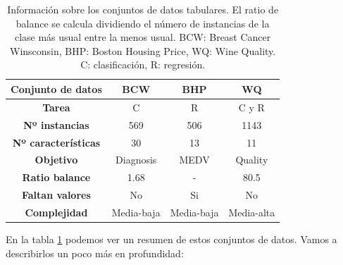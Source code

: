 \begin{table}[]
\centering
\begin{tabular}{|c|c|c|c|}
\hline
\textbf{Conjunto de datos}            & \textbf{BCW} & \textbf{BHP} & \textbf{WQ} \\ \hline
\textbf{Tarea}              & C            & R            & C y R       \\ \cline{1-1}
\textbf{Nº instancias}      & 569          & 506          & 1143        \\ \cline{1-1}
\textbf{Nº características} & 30           & 13           & 11          \\ \cline{1-1}
\textbf{Objetivo}           & Diagnosis    & MEDV         & Quality     \\ \cline{1-1}
\textbf{Ratio balance}      & 1.68         & -            & 80.5        \\ \cline{1-1}
\textbf{Faltan valores}     & No           & Si           & No          \\ \cline{1-1}
\textbf{Complejidad}        & Media-baja   & Media-baja        & Media-alta  \\ \hline
\end{tabular}
\caption{Información sobre los conjuntos de datos tabulares. El ratio de balance se calcula dividiendo el número de instancias de la clase más usual entre la menos usual. BCW: Breast Cancer Winsconsin, BHP: Boston Housing Price, WQ: Wine Quality. C: clasificación, R: regresión.}
\label{tab:dat_tab}
\end{table}
En la tabla \ref{tab:dat_tab} podemos ver un resumen de estos conjuntos de datos. Vamos a describirlos un poco más en profundidad:

